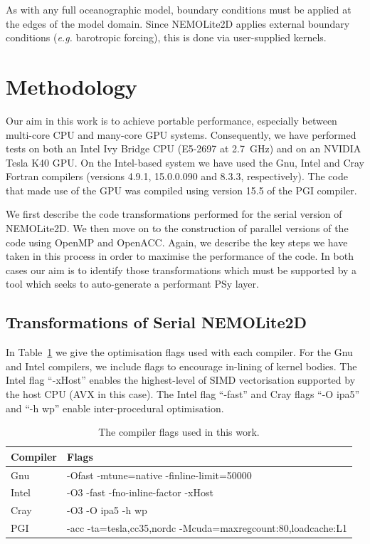 \documentclass[gmd, manuscript]{copernicus}
\begin{document}
As with any full oceanographic model, boundary conditions must be
applied at the edges of the model domain. Since NEMOLite2D applies
external boundary conditions (\textit{e.g.} barotropic forcing), this is
done via user-supplied kernels.


\section{Methodology}
\label{sec_methodology}

Our aim in this work is to achieve portable performance, especially
between multi-core CPU and many-core GPU systems. Consequently, we
have performed tests on both an Intel Ivy Bridge CPU (E5-2697 at
2.7~GHz) and on an NVIDIA Tesla K40 GPU.  On the Intel-based system we
have used the Gnu, Intel and Cray Fortran compilers (versions 4.9.1,
15.0.0.090 and 8.3.3, respectively). The code that made use of the GPU
was compiled using version 15.5 of the PGI compiler.

We first describe the code transformations performed for the serial
version of NEMOLite2D.  We then move on to the construction of
parallel versions of the code using OpenMP and OpenACC. Again, we
describe the key steps we have taken in this process in order to
maximise the performance of the code. In both cases our aim is to
identify those transformations which must be supported by a tool
which seeks to auto-generate a performant PSy layer.

\subsection{Transformations of Serial NEMOLite2D}

In Table~\ref{TABLE_compiler_flags} we give the optimisation flags
used with each compiler. For the Gnu and Intel compilers, we
include flags to encourage in-lining of kernel bodies. The Intel flag
``-xHost'' enables the highest-level of SIMD vectorisation supported
by the host CPU (AVX in this case). The Intel flag ``-fast'' and Cray
flags ``-O ipa5'' and ``-h wp'' enable inter-procedural optimisation.

\begin{table}[!t]
\caption{The compiler flags used in this work.}
\label{TABLE_compiler_flags}
\centering
\begin{tabular}{l|l}
\hline
Compiler  &  Flags                                                       \\
\hline
Gnu       & -Ofast -mtune=native -finline-limit=50000                    \\
Intel     & -O3 -fast -fno-inline-factor -xHost                          \\
Cray      & -O3 -O ipa5 -h wp                                            \\
PGI       & -acc -ta=tesla,cc35,nordc -Mcuda=maxregcount:80,loadcache:L1 \\
\hline
\end{tabular}
\end{table}
\end{document}

